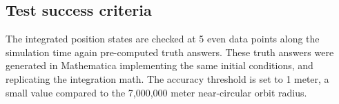 \subsection{Test success criteria}
The integrated position states are checked at 5 even data points along the simulation time again pre-computed truth answers.  These truth answers were generated in Mathematica implementing the same initial conditions, and replicating the integration math.    The accuracy threshold is set to 1 meter, a small value compared to the 7,000,000 meter near-circular orbit radius.  